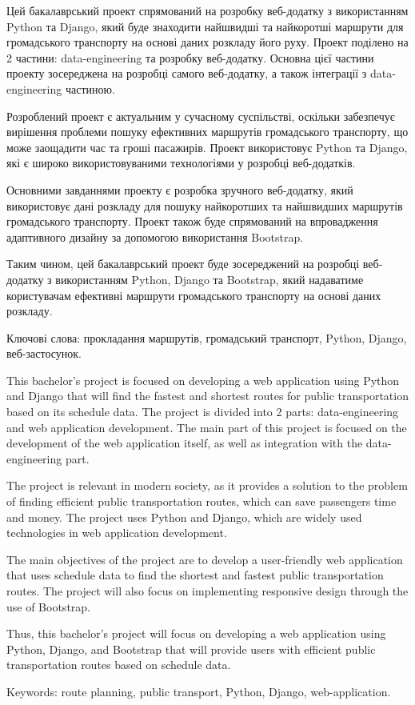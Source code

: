\abstractUkr


Цей бакалаврський проект спрямований на розробку веб-додатку з використанням Python та Django, який буде знаходити найшвидші та найкоротші маршрути для громадського транспорту на основі даних розкладу його  руху. Проект поділено на 2 частини: data-engineering та розробку веб-додатку. Основна цієї частини проекту зосереджена на розробці самого веб-додатку, а також інтеграції з data-engineering частиною.

Розроблений проект є актуальним у сучасному суспільстві, оскільки забезпечує вирішення проблеми пошуку ефективних маршрутів громадського транспорту, що може заощадити час та гроші пасажирів. Проект використовує Python та Django, які є широко використовуваними технологіями у розробці веб-додатків.

Основними завданнями проекту є розробка зручного веб-додатку, який використовує дані розкладу для пошуку найкоротших та найшвидших маршрутів громадського транспорту. Проект також буде спрямований на впровадження адаптивного дизайну за допомогою використання Bootstrap.

Таким чином, цей бакалаврський проект буде зосереджений на розробці веб-додатку з використанням Python, Django та Bootstrap, який надаватиме користувачам ефективні маршрути громадського транспорту на основі даних розкладу.

Ключові слова: прокладання маршрутів, громадський транспорт, Python, Django, веб-застосунок.


\abstractEng


This bachelor's project is focused on developing a web application using Python and Django that will find the fastest and shortest routes for public transportation based on its schedule data. The project is divided into 2 parts: data-engineering and web application development. The main part of this project is focused on the development of the web application itself, as well as integration with the data-engineering part.

The project is relevant in modern society, as it provides a solution to the problem of finding efficient public transportation routes, which can save passengers time and money. The project uses Python and Django, which are widely used technologies in web application development.

The main objectives of the project are to develop a user-friendly web application that uses schedule data to find the shortest and fastest public transportation routes. The project will also focus on implementing responsive design through the use of Bootstrap.

Thus, this bachelor's project will focus on developing a web application using Python, Django, and Bootstrap that will provide users with efficient public transportation routes based on schedule data.

Keywords: route planning, public transport, Python, Django, web-application.